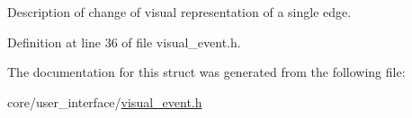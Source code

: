 Description of change of visual representation of a single edge. 

Definition at line 36 of file visual\+\_\+event.\+h.



The documentation for this struct was generated from the following file\+:\begin{DoxyCompactItemize}
\item 
core/user\+\_\+interface/\hyperlink{visual__event_8h}{visual\+\_\+event.\+h}\end{DoxyCompactItemize}

